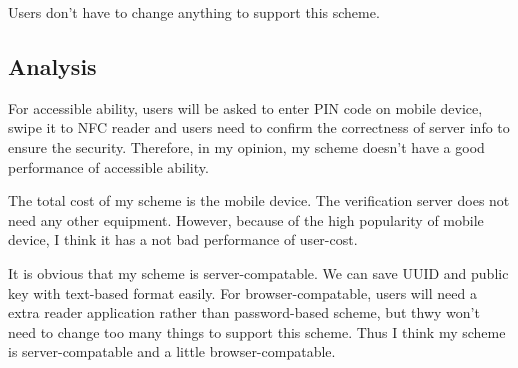 \begin{CJK}{Bg5}{bsmi}
Users don't have to change anything to support this scheme. 

\subsection{Analysis}

For accessible ability, users will be asked to enter PIN code on mobile device, swipe it to NFC reader and users need to confirm the correctness of server info to ensure the security. Therefore, in my opinion, my scheme doesn't have a good performance of accessible ability.

The total cost of my scheme is the mobile device. The verification server does not need any other equipment. However, because of the high popularity of mobile device, I think it has a not bad performance of user-cost.

It is obvious that my scheme is server-compatable. We can save UUID and public key with text-based format easily. For browser-compatable, users will need a extra reader application rather than password-based scheme, but thwy won't need to change too many things to support this scheme. Thus I think my scheme is server-compatable and a little browser-compatable. 

\end{CJK}